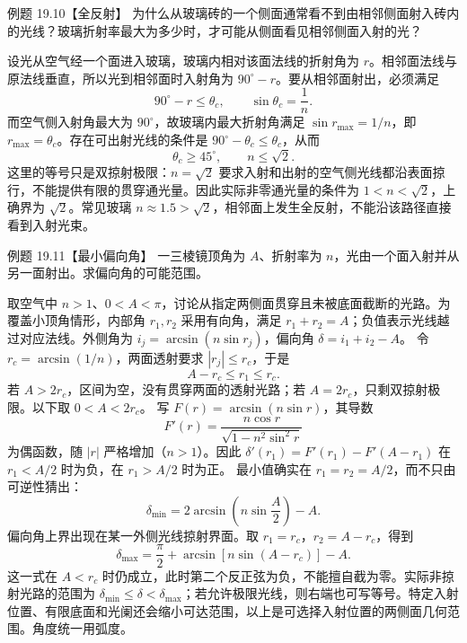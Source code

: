 \begin{origexamplebox}{例题 19.10【全反射】}
为什么从玻璃砖的一个侧面通常看不到由相邻侧面射入砖内的光线？玻璃折射率最大为多少时，才可能从侧面看见相邻侧面入射的光？
\end{origexamplebox}
\begin{xesolution}
设光从空气经一个面进入玻璃，玻璃内相对该面法线的折射角为 $r$。相邻面法线与原法线垂直，所以光到相邻面时入射角为 $90^\circ-r$。要从相邻面射出，必须满足
\[
 90^\circ-r\le\theta_c,\qquad \sin\theta_c=\frac1n.
\]
而空气侧入射角最大为 $90^\circ$，故玻璃内最大折射角满足 $\sin r_{\max}=1/n$，即 $r_{\max}=\theta_c$。存在可出射光线的条件是 $90^\circ-\theta_c\le\theta_c$，从而
\[
 \theta_c\ge45^\circ,\qquad \boxed{n\le\sqrt2}.
\]
这里的等号只是双掠射极限：$n=\sqrt2$ 要求入射和出射的空气侧光线都沿表面掠行，不能提供有限的贯穿通光量。因此实际非零通光量的条件为 $1<n<\sqrt2$，上确界为 $\sqrt2$。常见玻璃 $n\approx1.5>\sqrt2$，相邻面上发生全反射，不能沿该路径直接看到入射光束。
\end{xesolution}

\begin{origexamplebox}{例题 19.11【最小偏向角】}
一三棱镜顶角为 $A$、折射率为 $n$，光由一个面入射并从另一面射出。求偏向角的可能范围。
\end{origexamplebox}
\begin{xesolution}
取空气中 $n>1$、$0<A<\pi$，讨论从指定两侧面贯穿且未被底面截断的光路。为覆盖小顶角情形，内部角 $r_1,r_2$ 采用有向角，满足 $r_1+r_2=A$；负值表示光线越过对应法线。外侧角为 $i_j=\arcsin(n\sin r_j)$，偏向角 $\delta=i_1+i_2-A$。
令 $r_c=\arcsin(1/n)$，两面透射要求 $|r_j|\le r_c$，于是
\[
 A-r_c\le r_1\le r_c.
\]
若 $A>2r_c$，区间为空，没有贯穿两面的透射光路；若 $A=2r_c$，只剩双掠射极限。以下取 $0<A<2r_c$。
写 $F(r)=\arcsin(n\sin r)$，其导数
\[
 F'(r)=\frac{n\cos r}{\sqrt{1-n^2\sin^2r}}
\]
为偶函数，随 $|r|$ 严格增加（$n>1$）。因此
$\delta'(r_1)=F'(r_1)-F'(A-r_1)$ 在 $r_1<A/2$ 时为负，在 $r_1>A/2$ 时为正。
最小值确实在 $r_1=r_2=A/2$，而不只由可逆性猜出：
\[
 \boxed{\delta_{\min}=2\arcsin\!\left(n\sin\frac A2\right)-A}.
\]
偏向角上界出现在某一外侧光线掠射界面。取 $r_1=r_c$，$r_2=A-r_c$，得到
\[
 \boxed{\delta_{\max}=\frac\pi2+\arcsin[n\sin(A-r_c)]-A}.
\]
这一式在 $A<r_c$ 时仍成立，此时第二个反正弦为负，不能擅自截为零。实际非掠射光路的范围为 $\delta_{\min}\le\delta<\delta_{\max}$；若允许极限光线，则右端也可写等号。特定入射位置、有限底面和光阑还会缩小可达范围，以上是可选择入射位置的两侧面几何范围。角度统一用弧度。
\end{xesolution}

